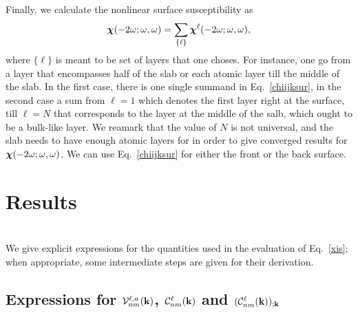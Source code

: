 \documentclass[floatfix,prb,aps,superscriptaddress,11pt,preprint,letterpaper]{revtex4}
\begin{document}
Finally, we calculate the nonlinear surface susceptibility as 
\begin{equation}\label{chiijksur}
\boldsymbol{\chi}(-2\omega;\omega,\omega)
= \sum_{\{\ell\}}\boldsymbol{\chi}^{\ell}(-2\omega;\omega,\omega),
\end{equation} 
where $\{\ell\}$
is meant to be set of layers that one choses. For instance, one go
from 
a layer that encompasses half of the slab  or each atomic layer till
the middle of the slab. In the first case, there is one single summand
in Eq.~\eqref{chiijksur}, in the second case a sum from
$\ell=1$ which denotes
the first layer right at the surface, 
till $\ell=N$ that corresponds to the layer at the middle of the salb, which ought to be
a bulk-like layer.
We reamark that the value of 
$N$ is not universal, and  
the slab needs to have enough atomic layers for 
in order to give converged results for $\boldsymbol{\chi} (-2\omega;\omega,\omega)$. 
We can use Eq.~\eqref{chiijksur} for 
either the front or the back surface. 

\section{Results}



\appendix 
\section{}\label{appe}
We give explicit expressions for the quantities used in the evaluation 
of Eq.~\eqref{xis}; when appropriate, some 
intermediate steps are given for their derivation. 
\subsection{ Expressions for 
\texorpdfstring{${\cal V}^{\ell,a}_{nm}(\mathbf{k})$, 
${\cal C}^{\ell}_{nm}(\mathbf{k})$ 
and
$({\cal C}^{\ell}_{nm}(\mathbf{k}))_{;\mathbf{k}}$
}{Vnm and Cnm}}\label{calpcalc}
\end{document}
